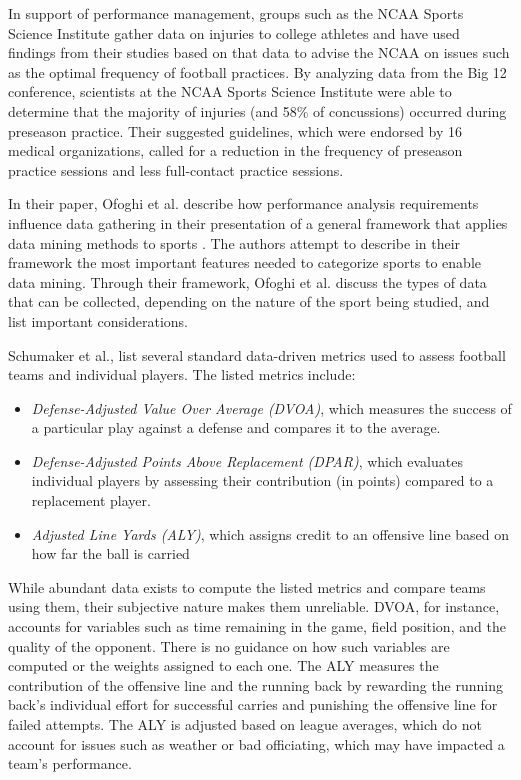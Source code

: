 \documentclass[sigconf]{acmart}
\begin{document}
In support of performance management, groups such as the NCAA Sports Science Institute gather data on injuries to college athletes and have used findings from their studies based on that data to advise the NCAA on issues such as the optimal frequency of football practices\cite{Solomon2017}. By analyzing data from the Big 12 conference, scientists at the NCAA Sports Science Institute were able to determine that the majority of injuries (and 58\% of concussions) occurred during preseason practice. Their suggested guidelines, which were endorsed by 16 medical organizations, called for a reduction in the frequency of preseason practice sessions and less full-contact practice sessions.

In their paper, Ofoghi et al. describe how performance analysis requirements influence data gathering in their presentation of a general framework that applies data mining methods to sports \cite{Ofoghi2013}. The authors attempt to describe in their framework the most important features needed to categorize sports to enable data mining. Through their framework, Ofoghi et al. discuss the types of data that can be collected, depending on the nature of the sport being studied, and list important considerations. 

Schumaker et al., list several standard data-driven metrics used to assess football teams and individual players\cite{Shumaker2010}. The listed metrics include:
\begin{itemize}
  \item \textit{Defense-Adjusted Value Over Average (DVOA)}, which measures the success of a particular play against a defense and compares it to the average. 
  \item \textit{Defense-Adjusted Points Above Replacement (DPAR)}, which evaluates individual players by assessing their contribution (in points) compared to a replacement player. 
  \item \textit{Adjusted Line Yards (ALY)}, which assigns credit to an offensive line based on how far the ball is carried
\end{itemize}

While abundant data exists to compute the listed metrics and compare teams using them, their subjective nature makes them unreliable. DVOA, for instance, accounts for variables such as time remaining in the game, field position, and the quality of the opponent. There is no guidance on how such variables are computed or the weights assigned to each one. The ALY measures the contribution of the offensive line and the running back by rewarding the running back's individual effort for successful carries and punishing the offensive line for failed attempts. The ALY is adjusted based on league averages, which do not account for issues such as weather or bad officiating, which may have impacted a team's performance.
\end{document}
